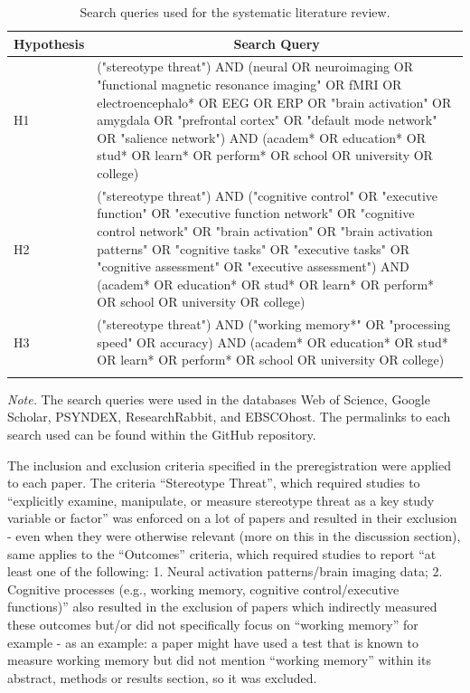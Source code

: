 \documentclass[
  stu]{apa7}
\begin{document}
\begin{table}[tbp]

\begin{center}
\begin{threeparttable}

\caption{\label{tab:query_table}Search queries used for the systematic literature review.}

\begin{tabular}{m{4cm}m{12cm}}
\toprule
Hypothesis & \multicolumn{1}{c}{Search Query}\\
\midrule
H1 & ("stereotype threat") AND 
(neural OR neuroimaging OR "functional magnetic resonance imaging" OR fMRI OR electroencephalo* OR EEG OR ERP OR "brain activation" OR amygdala OR "prefrontal cortex" OR "default mode network" OR "salience network") AND
(academ* OR education* OR stud* OR learn* OR perform* OR school OR university OR college)\\
H2 & ("stereotype threat") AND 
("cognitive control" OR "executive function" OR "executive function network" OR "cognitive control network" OR "brain activation" OR "brain activation patterns" OR "cognitive tasks" OR "executive tasks" OR "cognitive assessment" OR "executive assessment") AND 
(academ* OR education* OR stud* OR learn* OR perform* OR school OR university OR college)\\
H3 & ("stereotype threat") AND 
("working memory*" OR "processing speed" OR accuracy) AND 
(academ* OR education* OR stud* OR learn* OR perform* OR school OR university OR college)\\
\bottomrule
\addlinespace
\end{tabular}

\begin{tablenotes}[para]
\normalsize{\textit{Note.} The search queries were used in the databases Web of Science, Google Scholar, PSYNDEX, ResearchRabbit, and EBSCOhost. The permalinks to each search used can be found within the GitHub repository.}
\end{tablenotes}

\end{threeparttable}
\end{center}

\end{table}

The inclusion and exclusion criteria specified in the preregistration were applied to each paper.
The criteria ``Stereotype Threat'', which required studies to ``explicitly examine, manipulate, or measure stereotype threat as a key study variable or factor'' was enforced on a lot of papers and resulted in their exclusion - even when they were otherwise relevant (more on this in the discussion section), same applies to the ``Outcomes'' criteria, which required studies to report ``at least one of the following: 1. Neural activation patterns/brain imaging data; 2. Cognitive processes (e.g., working memory, cognitive control/executive functions)'' also resulted in the exclusion of papers which indirectly measured these outcomes but/or did not specifically focus on ``working memory'' for example - as an example: a paper might have used a test that is known to measure working memory but did not mention ``working memory'' within its abstract, methods or results section, so it was excluded.
\end{document}
